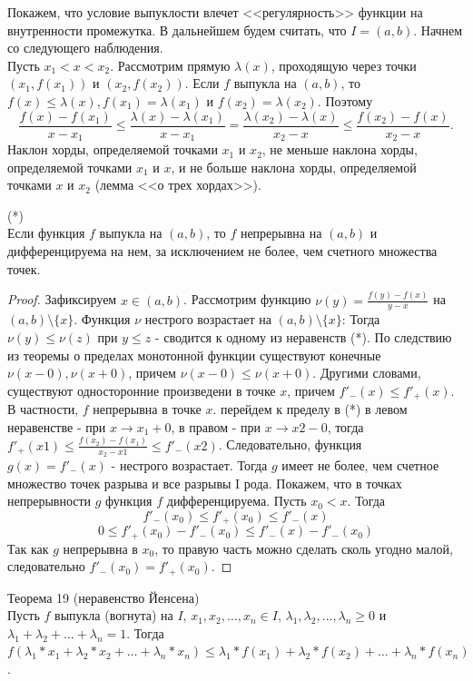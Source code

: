 Покажем, что условие выпуклости влечет <<регулярность>> функции на внутренности промежутка. В дальнейшем будем считать, что $I = (a,b)$. Начнем со следующего наблюдения.\\
Пусть $x_{1} < x < x_{2}$. Рассмотрим прямую $\lambda(x)$, проходящую через точки $(x_{1}, f(x_{1}))$ и $(x_{2}, f(x_{2}))$. Если $f$ выпукла на $(a,b)$, то $f(x) \leq \lambda(x), f(x_{1}) = \lambda(x_{1})$ и $f(x_{2}) = \lambda(x_{2})$. Поэтому
\[\frac{f(x) - f(x_{1})}{x - x_{1}} \leq \frac{\lambda(x) - \lambda(x_{1})}{x - x_{1}} = \frac{\lambda(x_{2}) - \lambda(x)}{x_{2} - x} \leq \frac{f(x_{2}) - f(x)}{x_{2} - x}.\]
Наклон хорды, определяемой точками $x_{1}$ и $x_{2}$, не меньше наклона хорды, определяемой точками $x_{1}$ и $x$, и не больше наклона хорды, определяемой точками $x$ и $x_{2}$ (лемма <<о трех хордах>>).

\begin{theorem} (*)\\
    Если функция $f$ выпукла на $(a, b)$, то $f$ непрерывна на $(a, b)$ и дифференцируема на нем,
    за исключением не более, чем счетного множества точек.
\end{theorem}

\begin{proof}
    Зафиксируем $x \in (a, b)$. Рассмотрим функцию $\nu(y) = \frac{f(y)-f(x)}{y-x}$
    на $(a, b) \setminus \{x\}$. Функция $\nu$ нестрого возрастает на $(a, b) \setminus \{x\}$:
    Тогда $\nu(y) \leq \nu(z)$ при $y \leq z$ - сводится к одному из неравенств (*).
    По следствию из теоремы о пределах монотонной функции существуют конечные
    $\nu(x-0), \nu(x+0)$, причем $\nu(x-0) \leq \nu(x+0)$.
    Другими словами, существуют односторонние произведени в точке $x$,
    причем $f'_-(x) \leq f'_+(x)$. В частности, $f$ непрерывна в точке $x$.
    перейдем к пределу в (*) в левом неравенстве - при $x \to x_1 + 0$,
    в правом - при $x \to x2 - 0$, тогда $f'_+(x1) \leq \frac{f(x_2) - f(x_1)}{x_2 - x1} \leq f'_-(x2)$.
    Следовательно, функция $g(x) = f'_-(x)$ - нестрого возрастает.
    Тогда $g$ имеет не более, чем счетное множество точек разрыва и все разрывы I рода.
    Покажем, что в точках непрерывности $g$ функция $f$ дифференцируема.
    Пусть $x_0 < x$. Тогда
    \[f'_-(x_0) \leq f'_+(x_0) \leq f'_-(x)\]
    \[0 \leq f'_+(x_0) - f'_-(x_0) \leq f'_-(x) - f'_-(x_0)\]
    Так как $g$ непрерывна в $x_0$, то правую часть можно сделать сколь угодно малой,
    следовательно $f'_-(x_0) = f'_+(x_0)$.
\end{proof}

\begin{theorem} Теорема 19 (неравенство Йенсена) \\
    Пусть $f$ выпукла (вогнута) на $I$, $x_1, x_2, \dots, x_n \in I$,
    $\lambda_1, \lambda_2, \dots, \lambda_n \geq 0$ и $\lambda_1 + \lambda_2 + \dots + \lambda_n = 1$.
    Тогда $f(\lambda_1*x_1 + \lambda_2*x_2 + \dots + \lambda_n*x_n) \leq \lambda_1*f(x_1) + \lambda_2*f(x_2) + \dots + \lambda_n*f(x_n)$.
\end{theorem}

